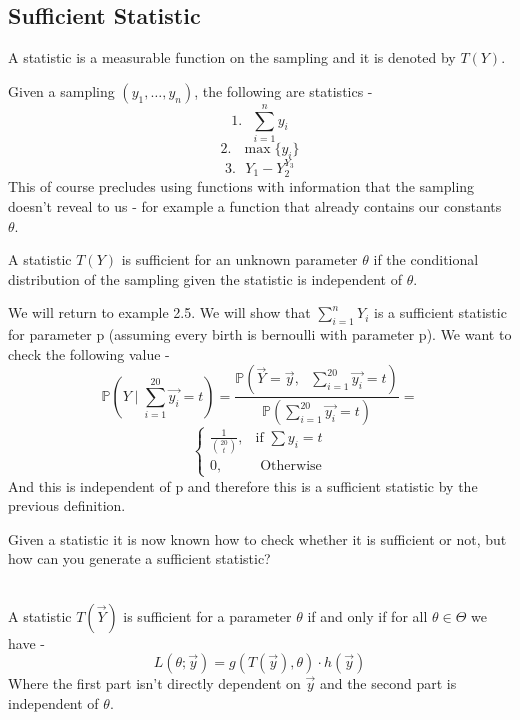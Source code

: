 \documentclass[../main.tex]{subfiles}
\begin{document}
\subsection{Sufficient Statistic}
\begin{definition} A statistic is a measurable function on the sampling and it is denoted by $T(Y)$. \end{definition}
\begin{example} Given a sampling $(y_1,\dots,y_n)$, the following are statistics -
\[1. \text{    }\sum_{i=1}^n y_i\]
\[2. \text{    }\max\{y_i\}\]
\[3. \text{    }Y_1-Y_2^{Y_3}\]
This of course precludes using functions with information that the sampling doesn't reveal to us - for example a function that already contains our constants $\theta$. \end{example}
\begin{example} A statistic $T(Y)$ is sufficient for an unknown parameter $\theta$ if the conditional distribution of the sampling given the statistic is independent of $\theta$. \end{example}
\begin{example} We will return to example 2.5. We will show that $\sum_{i=1}^n Y_i$ is a sufficient statistic for parameter p (assuming every birth is bernoulli with parameter p). We want to check the following value - \[\mathbb{P}\left(Y\mid \sum_{i=1}^{20} \overrightarrow{y_i} = t\right) = \frac{\mathbb{P}(\overrightarrow{Y}=\overrightarrow{y}, \text{ }\sum_{i=1}^{20} \overrightarrow{y_i} =t)}{\mathbb{P}(\sum_{i=1}^{20} \overrightarrow{y_i} = t)}=\]
\[\begin{cases} \frac{1}{\binom{20}{t}}, & \text{if } \sum y_i =t \\ 0, & \text{ Otherwise}
\end{cases}\]
And this is independent of p and therefore this is a sufficient statistic by the previous definition. \end{example}
Given a statistic it is now known how to check whether it is sufficient or not, but how can you generate a sufficient statistic? \\\\ 
\begin{theorem} 
A statistic $T(\overrightarrow{Y})$ is sufficient for a parameter $\theta$ if and only if for all $\theta\in\Theta$ we have - 
\[L(\theta;\overrightarrow{y}) = g(T(\overrightarrow{y}),\theta)\cdot h(\overrightarrow{y})\]
Where the first part isn't directly dependent on $\overrightarrow{y}$ and the second part is independent of $\theta$. \end{theorem}
\end{document}
